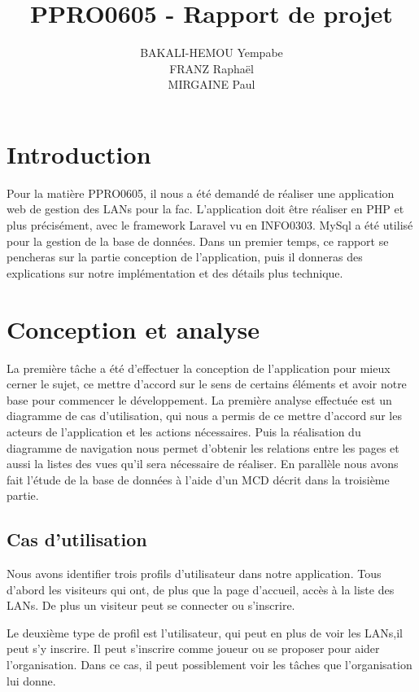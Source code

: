 \documentclass[12pt]{article}
\title{\textbf{PPRO0605 - Rapport de projet}}
\author{
		BAKALI-HEMOU Yempabe\\
		FRANZ Raphaël\\
		MIRGAINE Paul
		}
\date{}
\begin{document}
\maketitle

\section*{Introduction}

Pour la matière PPRO0605, il nous a été demandé de réaliser une application web de gestion des LANs pour la fac. L'application doit être réaliser en PHP et plus précisément, avec le framework Laravel vu en INFO0303. MySql a été utilisé pour la gestion de la base de données. Dans un premier temps, ce rapport se pencheras sur la partie conception de l'application, puis il donneras des explications sur notre implémentation et des détails plus technique.

\tableofcontents

\newpage

\section{Conception et analyse}
La première tâche a été d'effectuer la conception de l'application pour mieux cerner le sujet, ce mettre d'accord sur le sens de certains éléments et avoir notre base pour commencer le développement. La première analyse effectuée est un diagramme de cas d'utilisation, qui nous a permis de ce mettre d'accord sur les acteurs de l'application et les actions nécessaires. Puis la réalisation du diagramme de navigation nous permet d'obtenir les relations entre les pages et aussi la listes des vues qu'il sera nécessaire de réaliser. En parallèle nous avons fait l'étude de la base de données à l'aide d'un MCD décrit dans la troisième partie.
\subsection{Cas d'utilisation}

Nous avons identifier trois profils d'utilisateur dans notre application. Tous d'abord les visiteurs qui ont, de plus que la page d'accueil, accès à la liste des LANs. De plus un visiteur peut se connecter ou s'inscrire.
\newline

Le deuxième type de profil est l'utilisateur, qui peut en plus de voir les LANs,il peut s'y inscrire. Il peut s'inscrire comme joueur ou se proposer pour aider l'organisation. Dans ce cas, il peut possiblement voir les tâches que l'organisation lui donne.
\newline
\end{document}
